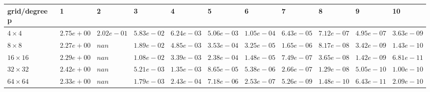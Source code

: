 \begin{tabular}{lllllllllll}
\hline
 grid/degree p   & 1          & 2          & 3          & 4          & 5          & 6          & 7          & 8          & 9          & 10         \\
\hline
 $4 \times 4$    & $2.75e+00$ & $2.02e-01$ & $5.83e-02$ & $6.24e-03$ & $5.06e-03$ & $1.05e-04$ & $6.43e-05$ & $7.12e-07$ & $4.95e-07$ & $3.63e-09$ \\
 $8 \times 8$    & $2.27e+00$ & $nan$      & $1.89e-02$ & $4.85e-03$ & $3.53e-04$ & $3.25e-05$ & $1.65e-06$ & $8.17e-08$ & $3.42e-09$ & $1.43e-10$ \\
 $16 \times 16$  & $2.29e+00$ & $nan$      & $1.08e-02$ & $3.39e-03$ & $2.38e-04$ & $1.48e-05$ & $7.49e-07$ & $3.65e-08$ & $1.42e-09$ & $6.81e-11$ \\
 $32 \times 32$  & $2.42e+00$ & $nan$      & $5.21e-03$ & $1.35e-03$ & $8.65e-05$ & $5.38e-06$ & $2.66e-07$ & $1.29e-08$ & $5.05e-10$ & $1.00e-10$ \\
 $64 \times 64$  & $2.33e+00$ & $nan$      & $1.79e-03$ & $2.43e-04$ & $7.18e-06$ & $2.53e-07$ & $5.26e-09$ & $1.48e-10$ & $6.43e-11$ & $2.09e-10$ \\
\hline
\end{tabular}